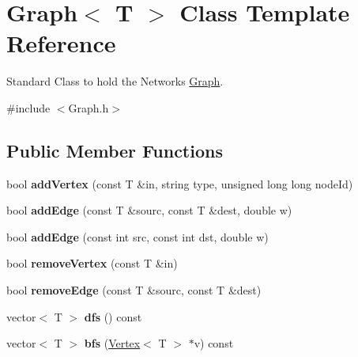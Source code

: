 \hypertarget{class_graph}{}\section{Graph$<$ T $>$ Class Template Reference}
\label{class_graph}


Standard Class to hold the Network\textquotesingle{}s \hyperlink{class_graph}{Graph}.  




{\ttfamily \#include $<$Graph.\+h$>$}

\subsection*{Public Member Functions}
\begin{DoxyCompactItemize}
\item 
\hypertarget{class_graph_a71bc98d8415ac258ecbe520beddf0615}{}\label{class_graph_a71bc98d8415ac258ecbe520beddf0615} 
bool {\bfseries add\+Vertex} (const T \&in, string type, unsigned long long node\+Id)
\item 
\hypertarget{class_graph_ac61af3aafe6277215f5a3b3cc7d58ce2}{}\label{class_graph_ac61af3aafe6277215f5a3b3cc7d58ce2} 
bool {\bfseries add\+Edge} (const T \&sourc, const T \&dest, double w)
\item 
\hypertarget{class_graph_ad30f780ecff925c7fcb607421bb805d4}{}\label{class_graph_ad30f780ecff925c7fcb607421bb805d4} 
bool {\bfseries add\+Edge} (const int src, const int dst, double w)
\item 
\hypertarget{class_graph_af9c903104ad69a7782979fa9caedf163}{}\label{class_graph_af9c903104ad69a7782979fa9caedf163} 
bool {\bfseries remove\+Vertex} (const T \&in)
\item 
\hypertarget{class_graph_a1106092a37366486cf55576f9ec01692}{}\label{class_graph_a1106092a37366486cf55576f9ec01692} 
bool {\bfseries remove\+Edge} (const T \&sourc, const T \&dest)
\item 
\hypertarget{class_graph_a911798b1a89f8c4ae90ba3eee849cff8}{}\label{class_graph_a911798b1a89f8c4ae90ba3eee849cff8} 
vector$<$ T $>$ {\bfseries dfs} () const
\item 
\hypertarget{class_graph_a56a5ea2c3aa7c0bd3849849be404a631}{}\label{class_graph_a56a5ea2c3aa7c0bd3849849be404a631} 
vector$<$ T $>$ {\bfseries bfs} (\hyperlink{class_vertex}{Vertex}$<$ T $>$ $\ast$v) const
\item 
\hypertarget{class_graph_a675559f8cddfe43bc416023ad9f28cfa}{}\label{class_graph_a675559f8cddfe43bc416023ad9f28cfa} 

\end{DoxyCompactItemize}
